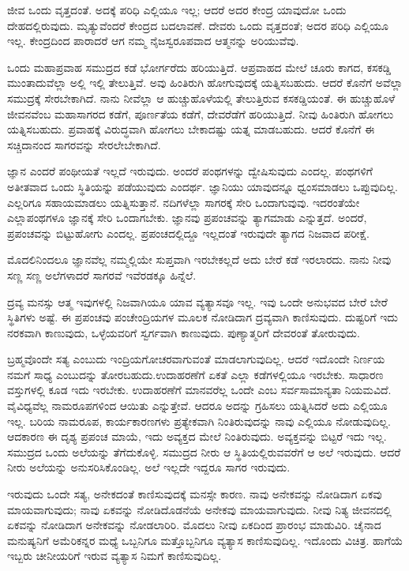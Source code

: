 \eject

ಜೀವ ಒಂದು ವೃತ್ತದಂತೆ. ಅದಕ್ಕೆ ಪರಿಧಿ ಎಲ್ಲಿಯೂ ಇಲ್ಲ; ಆದರೆ ಅದರ ಕೇಂದ್ರ ಯಾವುದೋ ಒಂದು ದೇಹದಲ್ಲಿರುವುದು. ಮೃತ್ಯುವೆಂದರೆ ಕೇಂದ್ರದ ಬದಲಾವಣೆ. ದೇವರು ಒಂದು ವೃತ್ತದಂತೆ; ಅದರ ಪರಿಧಿ ಎಲ್ಲಿಯೂ ಇಲ್ಲ. ಕೇಂದ್ರದಿಂದ ಪಾರಾದರೆ ಆಗ ನಮ್ಮ ನೈಜಸ್ವರೂಪವಾದ ಆತ್ಮನನ್ನು ಅರಿಯುವೆವು.

ಒಂದು ಮಹಾಪ್ರವಾಹ ಸಮುದ್ರದ ಕಡೆ ಭೋರ್ಗರೆದು ಹರಿಯುತ್ತಿದೆ. ಆ\break ಪ್ರವಾಹದ ಮೇಲೆ ಚೂರು ಕಾಗದ, ಕಸಕಡ್ಡಿ ಮುಂತಾದುವೆಲ್ಲಾ ಅಲ್ಲಿ ಇಲ್ಲಿ ತೇಲುತ್ತಿವೆ. ಅವು ಹಿಂತಿರುಗಿ ಹೋಗುವುದಕ್ಕೆ ಯತ್ನಿಸಬಹುದು. ಆದರೆ ಕೊನೆಗೆ ಅವೆಲ್ಲಾ ಸಮುದ್ರಕ್ಕೆ ಸೇರಬೇಕಾಗಿದೆ. ನಾನು ನೀವೆಲ್ಲಾ ಆ ಹುಚ್ಚುಹೊಳೆಯಲ್ಲಿ ತೇಲುತ್ತಿರುವ ಕಸಕಡ್ಡಿಯಂತೆ. ಈ ಹುಚ್ಚುಹೊಳೆ ಜೀವನವೆಂಬ ಮಹಾಸಾಗರದ ಕಡೆಗೆ, ಪೂರ್ಣತೆಯ ಕಡೆಗೆ, ದೇವರೆಡೆಗೆ ಹರಿಯುತ್ತಿದೆ. ನೀವು ಹಿಂತಿರುಗಿ ಹೋಗಲು ಯತ್ನಿಸಬಹುದು. ಪ್ರವಾಹಕ್ಕೆ ವಿರುದ್ಧವಾಗಿ ಹೋಗಲು ಬೇಕಾದಷ್ಟು ಯತ್ನ ಮಾಡಬಹುದು. ಆದರೆ ಕೊನೆಗೆ ಈ ಸಚ್ಚಿದಾನಂದ ಸಾಗರವನ್ನು ಸೇರಲೇಬೇಕಾಗಿದೆ.

ಜ್ಞಾನ ಎಂದರೆ ಪಂಥೀಯತೆ ಇಲ್ಲದೆ ಇರುವುದು. ಅಂದರೆ ಪಂಥಗಳನ್ನು ದ್ವೇಷಿಸುವುದು ಎಂದಲ್ಲ. ಪಂಥಗಳಿಗೆ ಅತೀತವಾದ ಒಂದು ಸ್ಥಿತಿಯನ್ನು ಪಡೆಯುವುದು ಎಂದರ್ಥ. ಜ್ಞಾನಿಯು ಯಾವುದನ್ನೂ ಧ್ವಂಸಮಾಡಲು ಒಪ್ಪುವುದಿಲ್ಲ. ಎಲ್ಲರಿಗೂ ಸಹಾಯಮಾಡಲು ಯತ್ನಿಸುತ್ತಾನೆ. ನದಿಗಳೆಲ್ಲಾ ಸಾಗರಕ್ಕೆ ಸೇರಿ ಒಂದಾಗುವುವು. ಇದರಂತೆಯೇ ಎಲ್ಲಾ\break ಪಂಥಗಳೂ ಜ್ಞಾನಕ್ಕೆ ಸೇರಿ ಒಂದಾಗಬೇಕು. ಜ್ಞಾನವು ಪ್ರಪಂಚವನ್ನು ತ್ಯಾಗಮಾಡು ಎನ್ನುತ್ತದೆ. ಅಂದರೆ, ಪ್ರಪಂಚವನ್ನು ಬಿಟ್ಟುಹೋಗು ಎಂದಲ್ಲ. ಪ್ರಪಂಚದಲ್ಲಿದ್ದೂ ಇಲ್ಲದಂತೆ ಇರುವುದೇ ತ್ಯಾಗದ ನಿಜವಾದ ಪರೀಕ್ಷೆ.

ಮೊದಲಿನಿಂದಲೂ ಜ್ಞಾನವೆಲ್ಲ ನಮ್ಮಲ್ಲಿಯೇ ಸುಪ್ತವಾಗಿ ಇರಬೇಕಲ್ಲದೆ ಅದು ಬೇರೆ ಕಡೆ ಇರಲಾರದು. ನಾನು ನೀವು ಸಣ್ಣ ಸಣ್ಣ ಅಲೆಗಳಾದರೆ ಸಾಗರವೆ ಇವೆರಡಕ್ಕೂ ಹಿನ್ನೆಲೆ.

ದ್ರವ್ಯ ಮನಸ್ಸು ಆತ್ಮ ಇವುಗಳಲ್ಲಿ ನಿಜವಾಗಿಯೂ ಯಾವ ವ್ಯತ್ಯಾಸವೂ ಇಲ್ಲ. ಇವು ಒಂದೇ ಅನುಭವದ ಬೇರೆ ಬೇರೆ ಸ್ಥಿತಿಗಳು ಅಷ್ಟೆ. ಈ ಪ್ರಪಂಚವು ಪಂಚೇಂದ್ರಿಯಗಳ ಮೂಲಕ ನೋಡಿದಾಗ ದ್ರವ್ಯವಾಗಿ ಕಾಣಿಸುವುದು. ದುಷ್ಟರಿಗೆ ಇದು ನರಕವಾಗಿ ಕಾಣುವುದು, ಒಳ್ಳೆಯವರಿಗೆ ಸ್ವರ್ಗವಾಗಿ ಕಾಣುವುದು. ಪುಣ್ಯಾತ್ಮರಿಗೆ ದೇವರಂತೆ ತೋರುವುದು.

ಬ್ರಹ್ಮವೊಂದೇ ಸತ್ಯ ಎಂಬುದು ಇಂದ್ರಿಯಗೋಚರವಾಗುವಂತೆ ಮಾಡಲಾಗುವುದಿಲ್ಲ. ಆದರೆ ಇದೊಂದೇ ನಿರ್ಣಯ ನಮಗೆ ಸಾಧ್ಯ ಎಂಬುದನ್ನು ತೋರಬಹುದು.\break ಉದಾಹರಣೆಗೆ ಏಕತೆ ಎಲ್ಲಾ ಕಡೆಗಳಲ್ಲಿಯೂ ಇರಬೇಕು. ಸಾಧಾರಣ ವಸ್ತುಗಳಲ್ಲಿ ಕೂಡ ಇದು ಇರಬೇಕು. ಉದಾಹರಣೆಗೆ ಮಾನವರೆಲ್ಲ ಒಂದೇ ಎಂಬ ಸರ್ವಸಾಮಾನ್ಯತಾ ನಿಯಮವಿದೆ. ವೈವಿಧ್ಯವೆಲ್ಲ ನಾಮರೂಪಗಳಿಂದ ಆಯಿತು ಎನ್ನುತ್ತೇವೆ. ಆದರೂ ಅದನ್ನು ಗ್ರಹಿಸಲು ಯತ್ನಿಸಿದರೆ ಅದು ಎಲ್ಲಿಯೂ ಇಲ್ಲ. ಬರಿಯ ನಾಮರೂಪ, ಕಾರ್ಯಕಾರಣಗಳು ಪ್ರತ್ಯೇಕವಾಗಿ ನಿಂತಿರುವುದನ್ನು ನಾವು ಎಲ್ಲಿಯೂ ನೋಡುವುದಿಲ್ಲ. ಆದಕಾರಣ ಈ ದೃಶ್ಯ ಪ್ರಪಂಚ ಮಾಯೆ, ಇದು ಅವ್ಯಕ್ತದ ಮೇಲೆ ನಿಂತಿರುವುದು. ಅವ್ಯಕ್ತವನ್ನು ಬಿಟ್ಟರೆ ಇದು ಇಲ್ಲ. ಸಮುದ್ರದ ಒಂದು ಅಲೆಯನ್ನು ತೆಗೆದುಕೊಳ್ಳಿ. ಸಮುದ್ರದ ನೀರು ಆ ಸ್ಥಿತಿಯಲ್ಲಿರುವವರೆಗೆ ಆ ಅಲೆ ಇರುವುದು. ಆದರೆ ನೀರು ಅಲೆಯನ್ನು ಅನುಸರಿಸಿಕೊಂಡಿಲ್ಲ. ಅಲೆ ಇಲ್ಲದೇ ಇದ್ದರೂ ಸಾಗರ ಇರುವುದು.

ಇರುವುದು ಒಂದೇ ಸತ್ಯ, ಅನೇಕದಂತೆ ಕಾಣಿಸುವುದಕ್ಕೆ ಮನಸ್ಸೇ ಕಾರಣ. ನಾವು ಅನೇಕವನ್ನು ನೋಡಿದಾಗ ಏಕವು ಮಾಯವಾಗುವುದು; ನಾವು ಏಕವನ್ನು ನೋಡಿದೊಡನೆಯೆ ಅನೇಕವು ಮಾಯವಾಗುವುದು. ನೀವು ನಿತ್ಯ ಜೀವನದಲ್ಲಿ ಏಕವನ್ನು ನೋಡಿದಾಗ ಅನೇಕವನ್ನು ನೋಡಲಾರಿರಿ. ಮೊದಲು ನೀವು ಏಕದಿಂದ ಪ್ರಾರಂಭ ಮಾಡುವಿರಿ. ಚೈನಾದ ಮನುಷ್ಯನಿಗೆ ಅಮೆರಿಕನ್ನರ ಮಧ್ಯೆ ಒಬ್ಬನಿಗೂ ಮತ್ತೊಬ್ಬನಿಗೂ ವ್ಯತ್ಯಾಸ ಕಾಣಿಸುವುದಿಲ್ಲ. ಇದೊಂದು ವಿಚಿತ್ರ. ಹಾಗೆಯೆ ಇಬ್ಬರು ಚೀನೀಯರಿಗೆ ಇರುವ ವ್ಯತ್ಯಾಸ ನಿಮಗೆ ಕಾಣಿಸುವುದಿಲ್ಲ.


